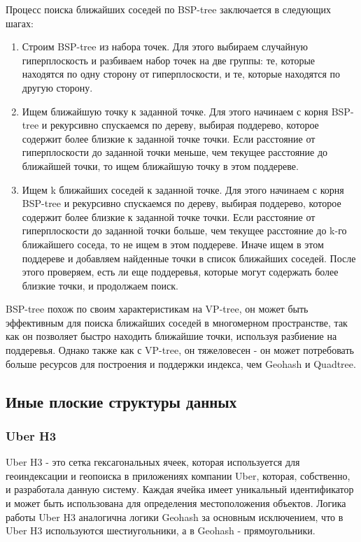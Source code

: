 Процесс поиска ближайших соседей по BSP-tree заключается в следующих шагах:
\begin{enumerate}
    \item Строим BSP-tree из набора точек. Для этого выбираем случайную гиперплоскость и разбиваем набор точек на две группы: те, которые находятся по одну сторону от гиперплоскости, и те, которые находятся по другую сторону.
    \item Ищем ближайшую точку к заданной точке. Для этого начинаем с корня BSP-tree и рекурсивно спускаемся по дереву, выбирая поддерево, которое содержит более близкие к заданной точке точки. Если расстояние от гиперплоскости до заданной точки меньше, чем текущее расстояние до ближайшей точки, то ищем ближайшую точку в этом поддереве.
    \item Ищем k ближайших соседей к заданной точке. Для этого начинаем с корня BSP-tree и рекурсивно спускаемся по дереву, выбирая поддерево, которое содержит более близкие к заданной точке точки. Если расстояние от гиперплоскости до заданной точки больше, чем текущее расстояние до k-го ближайшего соседа, то не ищем в этом поддереве. Иначе ищем в этом поддереве и добавляем найденные точки в список ближайших соседей. После этого проверяем, есть ли еще поддеревья, которые могут содержать более близкие точки, и продолжаем поиск.
\end{enumerate}

BSP-tree похож по своим характеристикам на VP-tree, он может быть эффективным для поиска ближайших соседей в многомерном пространстве, так как он позволяет быстро находить ближайшие точки, используя разбиение на поддеревья. Однако также как с VP-tree, он тяжеловесен - он может потребовать больше ресурсов для построения и поддержки индекса, чем Geohash и Quadtree.

\subsection{Иные плоские структуры данных}
\subsubsection{Uber H3}
Uber H3 - это сетка гексагональных ячеек, которая используется для геоиндексации и геопоиска в приложениях компании Uber, которая, собственно, и разработала данную систему. Каждая ячейка имеет уникальный идентификатор и может быть использована для определения местоположения объектов. Логика работы Uber H3 аналогична логики Geohash за основным исключением, что в Uber H3 используются шестиугольники, а в Geohash - прямоугольники.

